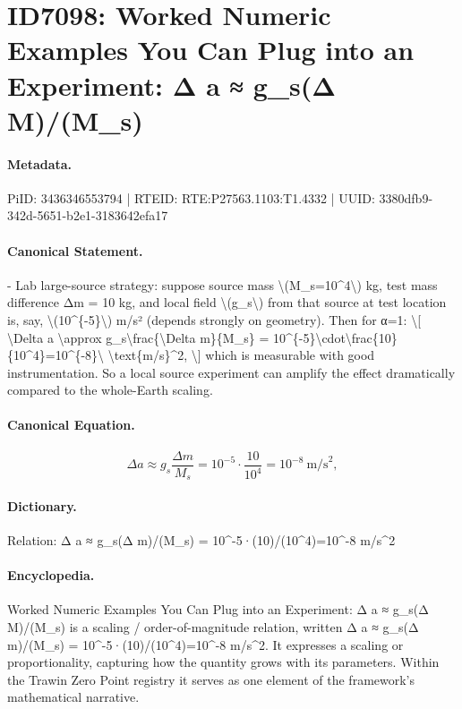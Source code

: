 \section*{ID7098: Worked Numeric Examples You Can Plug into an Experiment: Δ a ≈ g\_s(Δ M)/(M\_s)}
\paragraph{Metadata.}
PiID: 3436346553794 | RTEID: RTE:P27563.1103:T1.4332 | UUID: 3380dfb9-342d-5651-b2e1-3183642efa17

\paragraph{Canonical Statement.}
- Lab large-source strategy: suppose source mass \textbackslash{}(M\_s=10\textasciicircum{}4\textbackslash{}) kg, test mass difference Δm = 10 kg, and local field \textbackslash{}(g\_s\textbackslash{}) from that source at test location is, say, \textbackslash{}(10\textasciicircum{}\{-5\}\textbackslash{}) m/s² (depends strongly on geometry). Then for α=1: \textbackslash{}[ \textbackslash{}Delta a \textbackslash{}approx g\_s\textbackslash{}frac\{\textbackslash{}Delta m\}\{M\_s\} = 10\textasciicircum{}\{-5\}\textbackslash{}cdot\textbackslash{}frac\{10\}\{10\textasciicircum{}4\}=10\textasciicircum{}\{-8\}\textbackslash{} \textbackslash{}text\{m/s\}\textasciicircum{}2, \textbackslash{}] which is measurable with good instrumentation. So a local source experiment can amplify the effect dramatically compared to the whole-Earth scaling.

\paragraph{Canonical Equation.}
\[
\Delta a \approx g_s\frac{\Delta m}{M_s} = 10^{-5}\cdot\frac{10}{10^4}=10^{-8}\ \text{m/s}^2,
\]

\paragraph{Dictionary.}
Relation: Δ a ≈ g\_s(Δ m)/(M\_s) = 10\textasciicircum{}-5·(10)/(10\textasciicircum{}4)=10\textasciicircum{}-8 m/s\textasciicircum{}2

\paragraph{Encyclopedia.}
Worked Numeric Examples You Can Plug into an Experiment: Δ a ≈ g\_s(Δ M)/(M\_s) is a scaling / order-of-magnitude relation, written Δ a ≈ g\_s(Δ m)/(M\_s) = 10\textasciicircum{}-5·(10)/(10\textasciicircum{}4)=10\textasciicircum{}-8 m/s\textasciicircum{}2. It expresses a scaling or proportionality, capturing how the quantity grows with its parameters. Within the Trawin Zero Point registry it serves as one element of the framework's mathematical narrative.
